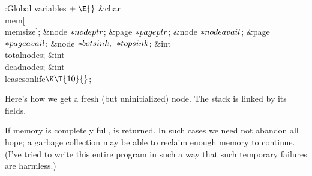 \B{}:Global variables\X${}\mathrel+\E{}$\6
\&{char} \\{mem}[\\{memsize}];\6
\&{node} ${}{*}\\{nodeptr}{}$;\6
\&{page} ${}{*}\\{pageptr}{}$;\6
\&{node} ${}{*}\\{nodeavail}{}$;\6
\&{page} ${}{*}\\{pageavail}{}$;\6
\&{node} ${}{*}\\{botsink},{}$ ${}{*}\\{topsink}{}$;\6
\&{int} \\{totalnodes};\6
\&{int} \\{deadnodes};\6
\&{int} \\{leasesonlife}${}\K\T{10}{}$;\par
\fi

Here's how we get a fresh (but uninitialized) node.
The  stack is linked by its  fields.

If memory is completely full, \PB{$\NULL$} is returned. In such cases
we need not abandon all hope; a garbage collection may be able
to reclaim enough memory to continue. (I've tried to write this
entire program in such a way that such temporary failures are harmless.)

